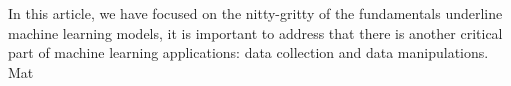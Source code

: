 In this article, we have focused on the nitty-gritty of the fundamentals underline machine learning models, it is important to address that there is another critical part of machine learning applications: data collection and data manipulations. Mat 